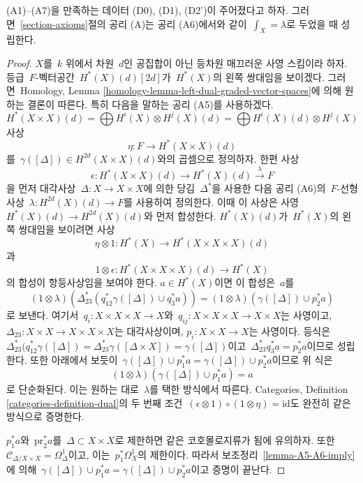 \begin{lemma}
\label{lemma-poincare-duality}
(A1)--(A7)을 만족하는 데이터 (D0), (D1), (D2')이 주어졌다고 하자.
그러면\  \ref{section-axioms}절의 공리 (A)는 공리 (A6)에서와 같이\ 
$\int_X = \lambda$로 두었을 때 성립한다.
\end{lemma}

\begin{proof}
$X$를\  $k$ 위에서 차원\  $d$인 공집합이 아닌 등차원 매끄러운 사영
스킴이라 하자. 등급\  $F$-벡터공간\  $H^*(X)(d)[2d]$가\  $H^*(X)$의
왼쪽 쌍대임을 보이겠다. 그러면\  Homology, Lemma
\ref{homology-lemma-left-dual-graded-vector-spaces}에 의해 원하는
결론이 따른다. 특히 다음을 말하는 공리 (A5)를 사용하겠다.
$$
H^*(X \times X)(d) =
\bigoplus H^i(X) \otimes H^j(X)(d) =
\bigoplus H^i(X)(d) \otimes H^j(X)
$$
사상
$$
\eta : F \longrightarrow H^*(X \times X)(d)
$$
를\  $\gamma([\Delta]) \in H^{2d}(X \times X)(d)$와의 곱셈으로
정의하자. 한편 사상
$$
\epsilon :
H^*(X \times X)(d) \longrightarrow H^*(X)(d) \xrightarrow{\lambda} F
$$
을 먼저 대각사상\  $\Delta : X \to X \times X$에 의한 당김\ 
$\Delta^*$을 사용한 다음 공리 (A6)의\  $F$-선형 사상\ 
$\lambda : H^{2d}(X)(d) \to F$를 사용하여 정의한다. 이때 이 사상은
사영\  $H^*(X)(d) \to H^{2d}(X)(d)$와 먼저 합성한다.
$H^*(X)(d)$가\  $H^*(X)$의 왼쪽 쌍대임을 보이려면 사상
$$
\eta \otimes 1 :
H^*(X) \longrightarrow H^*(X \times X \times X)(d)
$$
과
$$
1 \otimes \epsilon : H^*(X \times X \times X)(d) \longrightarrow H^*(X)
$$
의 합성이 항등사상임을 보여야 한다. $a \in H^*(X)$이면 이 합성은\ 
$a$를
$$
(1 \otimes \lambda)(\Delta_{23}^*(q_{12}^*\gamma([\Delta]) \cup q_3^*a)) =
(1 \otimes \lambda)(\gamma([\Delta]) \cup p_2^*a)
$$
로 보낸다. 여기서\  $q_i : X \times X \times X \to X$와\ 
$q_{ij} : X \times X \times X \to X \times X$는 사영이고,
$\Delta_{23} : X \times X \to X \times X \times X$는 대각사상이며,
$p_i : X \times X \to X$는 사영이다. 등식은\ 
$\Delta_{23}^*(q_{12}^*\gamma([\Delta]) =
\Delta_{23}^*\gamma([\Delta \times X]) = \gamma([\Delta])$이고\ 
$\Delta_{23}^* q_3^*a = p_2^*a$이므로 성립한다. 또한 아래에서
보듯이\ 
$\gamma([\Delta]) \cup p_1^*a = \gamma([\Delta]) \cup p_2^*a$이므로
위 식은
$$
(1 \otimes \lambda)(\gamma([\Delta]) \cup p_1^*a) = a
$$
로 단순화된다. 이는 원하는 대로\  $\lambda$를 택한 방식에서 따른다.
Categories, Definition \ref{categories-definition-dual}의 두 번째 조건\ 
$(\epsilon \otimes 1) \circ (1 \otimes \eta) = \text{id}$도 완전히
같은 방식으로 증명한다.

\medskip\noindent
$p_1^*a$와\  $\text{pr}_2^*a$를\  $\Delta \subset X \times X$로
제한하면 같은 코호몰로지류가 됨에 유의하자. 또한\ 
$\mathcal{C}_{\Delta/X \times X} = \Omega^1_\Delta$이고, 이는\ 
$p_1^*\Omega^1_X$의 제한이다. 따라서 보조정리\ 
\ref{lemma-A5-A6-imply}에 의해\ 
$\gamma([\Delta]) \cup p_1^*a = \gamma([\Delta]) \cup p_2^*a$이고
증명이 끝난다.
\end{proof}

